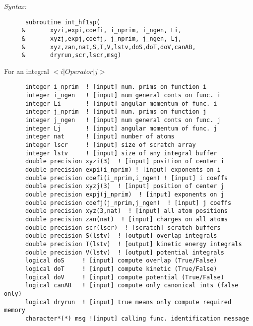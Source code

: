 {\it Syntax:} 
\begin{verbatim} 
      subroutine int_hf1sp( 
     &       xyzi,expi,coefi, i_nprim, i_ngen, Li, 
     &       xyzj,expj,coefj, j_nprim, j_ngen, Lj, 
     &       xyz,zan,nat,S,T,V,lstv,doS,doT,doV,canAB, 
     &       dryrun,scr,lscr,msg) 
\end{verbatim} 
For an integral $<i|Operator|j>$ 
\begin{verbatim} 
      integer i_nprim  ! [input] num. prims on function i 
      integer i_ngen   ! [input] num general conts on func. i 
      integer Li       ! [input] angular momentum of func. i   
      integer j_nprim  ! [input] num. prims on function j      
      integer j_ngen   ! [input] num general conts on func. j  
      integer Lj       ! [input] angular momentum of func. j   
      integer nat      ! [input] number of atoms 
      integer lscr     ! [input] size of scratch array 
      integer lstv     ! [input] size of any integral buffer 
      double precision xyzi(3)  ! [input] position of center i 
      double precision expi(i_nprim) ! [input] exponents on i 
      double precision coefi(i_nprim,i_ngen) ! [input] i coeffs 
      double precision xyzj(3)  ! [input] position of center j 
      double precision expj(j_nprim)  ! [input] exponents on j 
      double precision coefj(j_nprim,j_ngen)  ! [input] j coeffs 
      double precision xyz(3,nat)  ! [input] all atom positions 
      double precision zan(nat)  ! [input] charges on all atoms 
      double precision scr(lscr)  ! [scratch] scratch buffers 
      double precision S(lstv)  ! [output] overlap integrals 
      double precision T(lstv)  ! [output] kinetic energy integrals 
      double precision V(lstv)  ! [output] potential integrals 
      logical doS     ! [input] compute overlap (True/False) 
      logical doT     ! [input] compute kinetic (True/False) 
      logical doV     ! [input] compute potential (True/False) 
      logical canAB   ! [input] compute only canonical ints (false only) 
      logical dryrun  ! [input] true means only compute required memory 
      character*(*) msg ![input] calling func. identification message 
\end{verbatim} 

